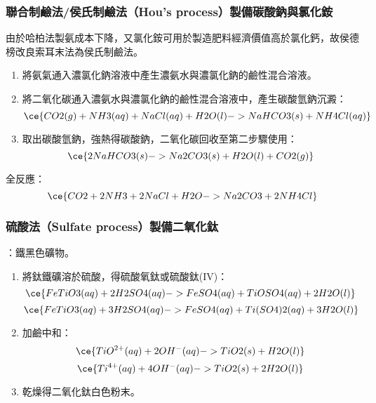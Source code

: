 \documentclass[a4paper,12pt]{report}
\begin{document}
\begin{itemize}
\begin{itemize}
\subsubsection{聯合制鹼法/侯氏制鹼法（Hou's process）製備碳酸鈉與氯化銨}
由於哈柏法製氨成本下降，又氯化銨可用於製造肥料經濟價值高於氯化鈣，故侯德榜改良索耳末法為侯氏制鹼法。
\begin{enumerate}
\item 將氨氣通入濃氯化鈉溶液中產生濃氨水與濃氯化鈉的鹼性混合溶液。
\item 將二氧化碳通入濃氨水與濃氯化鈉的鹼性混合溶液中，產生碳酸氫鈉沉澱：
\[\ce{CO2(g) + NH3(aq) + NaCl(aq) + H2O(l) -> NaHCO3(s) + NH4Cl(aq)}\]
\item 取出碳酸氫鈉，強熱得碳酸鈉，二氧化碳回收至第二步驟使用：
\[\ce{2NaHCO3(s) -> Na2CO3(s) + H2O(l) + CO2(g)}\]
\end{enumerate}
全反應：
\[\ce{CO2 + 2NH3 + 2NaCl + H2O -> Na2CO3 + 2NH4Cl}\]
\subsubsection{硫酸法（Sulfate process）製備二氧化鈦}
：鐵黑色礦物。
\begin{enumerate}
\item 將鈦鐵礦溶於硫酸，得硫酸氧鈦或硫酸鈦(IV)：
\[\ce{FeTiO3(aq) + 2H2SO4(aq) -> FeSO4(aq) + TiOSO4(aq) + 2H2O(l)}\]
\[\ce{FeTiO3(aq) + 3H2SO4(aq) -> FeSO4(aq) + Ti(SO4)2(aq) + 3H2O(l)}\]
\item 加鹼中和：
\[\ce{TiO^{2+}(aq) + 2OH^-(aq) -> TiO2(s) + H2O(l)}\]
\[\ce{Ti^{4+}(aq) + 4OH^-(aq) -> TiO2(s) + 2H2O(l)}\]
\item 乾燥得二氧化鈦白色粉末。
\end{enumerate}

\end{itemize}
\end{itemize}
\end{document}
